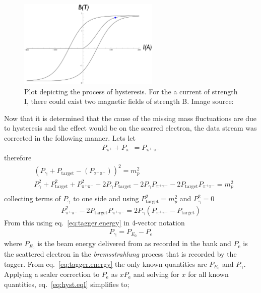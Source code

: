 \begin{figure}\begin{center}
\includegraphics[width=0.6\textwidth]{figures/calib/tag/ecor/hysteresis_keynote.eps}
\caption[Plot Depicting the Process of Hysteresis]{\label{fig:hyst}Plot depicting the process of hysteresis. For the a current of strength I, there could exist two magnetic fields of strength B. Image source:~\cite{clas.thesis.kunkel}}
\end{center}\end{figure}
\FloatBarrier
Now that it is determined that the cause of the  missing mass fluctuations are due to hysteresis and the effect would be on the scarred electron, the  data stream was corrected in the following manner. Lets let
\begin{align}
P_\text{π$^+$} + P_\text{π$^-$} = P_\text{π$^+$ π$^-$} \nonumber
\end{align}
therefore
\begin{align}
&(P_\text{γ} + P_\mathrm{target} - (P_\text{π$^+$π$^-$}))^2 = m_p^2 \\
& P_\text{γ}^2 + P_\mathrm{target}^2 + P_\text{π$^+$π$^-$}^2 + 2P_\text{γ}P_\mathrm{target} - 2P_\text{γ}P_\text{π$^+$π$^-$} - 2P_\mathrm{target}P_\text{π$^+$π$^-$}= m_p^2\\
\end{align}
collecting terms of $P_\text{γ}$ to one side and using $P_\mathrm{target}^2 = m_p^2 $ and $P_\text{γ}^2 = 0$
\begin{align}\label{eq:hyst.eqI}
 P_\text{π$^+$π$^-$}^2 - 2P_\mathrm{target}P_\text{π$^+$π$^-$}= 2P_\text{γ}(P_\text{π$^+$π$^-$} - P_\mathrm{target})
\end{align}
From this using eq.~\ref{eq:tagger.energy} in 4-vector notation
\begin{align}\label{eq:tagger.energyII}
P_\text{γ} = P_{E_0} - P_\text{e}\nonumber
\end{align}
where $P_{E_0}$ is the beam energy delivered from  as recorded in the  bank and $P_\text{e}$ is the scattered electron in the \emph{bremsstrahlung} process that is recorded by the tagger. From eq.~\ref{eq:tagger.energy} the only known quantities are $P_{E_0}$ and $P_\text{γ}$. Applying a scaler correction to $P_\text{e}$ as $xP_\text{e}$ and solving for $x$ for all known quantities, eq.~\ref{eq:hyst.eqI} simplifies to;
